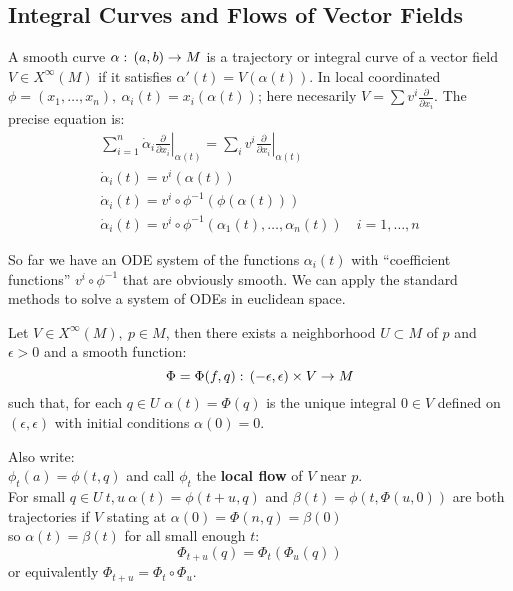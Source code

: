 \subsection{Integral Curves and Flows of Vector Fields}
\begin{ddef}
    A smooth curve $\alpha:\, (a,b) \to M $ is a trajectory or integral curve of a vector field $V\in X^\infty (M)$ if it satisfies $\alpha ' (t) = V(\alpha(t))$. 
    In local coordinated $\phi=(x_1,\ldots, x_n),\ \alpha_i(t) = x_i(\alpha(t))$; here necesarily $V=\sum v^i\frac{\partial}{\partial x_i}$. The precise equation is:
    \begin{gather*} 
    \sum_{i=1}^n \dot \alpha_i \left. \frac{\partial}{\partial x_i} \right|_{\alpha(t)} = \sum_i v^i \left. \frac{\partial}{\partial x_i} \right|_{\alpha(t)}\\
    \dot \alpha_i(t) = v^i(\alpha(t))\\
    \dot \alpha_i(t) = v^i\circ \phi^{-1}(\phi(\alpha(t)))\\
    \dot \alpha_i(t) = v^i\circ \phi^{-1}(\alpha_1(t), \ldots , \alpha_n(t)) \quad i=1,\ldots, n
\end{gather*}
\end{ddef}

So far we have an ODE system of the functions $\alpha_i(t)$ with ``coefficient functions'' $v^i\circ \phi^{-1} $ that are obviously smooth. We can apply the standard methods to solve a system of ODEs in euclidean space.

\begin{teorema}
    Let $V\in X^\infty (M), \ p\in M$, then there exists a neighborhood $U\subset M $ of $p$ and $\epsilon > 0$ and a smooth function:
    $$\Phi = \Phi(f,q) :\, (-\epsilon, \epsilon)\times V\to M$$
    such that, for each $q\in U$ $\alpha(t) = \Phi(q)$ is the unique integral $0\in V$ defined on $(\epsilon,\epsilon)$ with initial conditions $\alpha(0) = 0$.
\end{teorema}
    Also write: \\
    $\phi_t(a) = \phi(t,q)$ and call $\phi_t$ the \textbf{local flow} of $V$ near $p$.\\
    For small $q\in U\ t,u\ \alpha(t) = \phi(t+u,q)$ and $\beta(t) = \phi(t,\Phi(u,0))$ are both trajectories if $V$ stating at $\alpha(0) = \Phi(n,q) = \beta(0)$\\
    so $\alpha(t) = \beta(t)$ for all small enough $t$:
    $$ \Phi_{t+u} (q) = \Phi_t(\Phi_u(q))$$
    or equivalently $\Phi_{t+u} = \Phi_t \circ \Phi_u$. 
    
